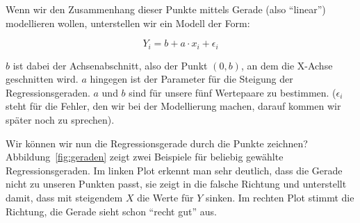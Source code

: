 \documentclass[ngerman, 12pt]{scrartcl}
\begin{document}
Wenn wir den Zusammenhang dieser Punkte mittels Gerade (also \enquote{linear}) modellieren wollen, unterstellen wir ein Modell der Form: 
   
\begin{equation}
	 Y_i = b + a \cdot x_i + \epsilon_i
\end{equation}
   
$b$ ist dabei der Achsenabschnitt, also der Punkt $(0,b)$, an dem die X-Achse geschnitten wird. $a$ hingegen ist der Parameter für die Steigung der Regressionsgeraden. $a$ und $b$ sind für unsere fünf Wertepaare zu bestimmen. ($\epsilon_i$ steht für die Fehler, den wir bei der Modellierung machen, darauf kommen wir später noch zu sprechen). 

Wir können wir nun die Regressionsgerade durch die Punkte zeichnen? Abbildung~\ref{fig:geraden} zeigt zwei Beispiele für beliebig gewählte Regressionsgeraden. Im linken Plot erkennt man sehr deutlich, dass die Gerade nicht zu unseren Punkten passt, sie zeigt in die falsche Richtung und unterstellt damit, dass mit steigendem $X$ die Werte für $Y$ sinken. Im rechten Plot stimmt die Richtung, die Gerade sieht schon \enquote{recht gut} aus. 

\label{fig:geraden}
\end{document}
